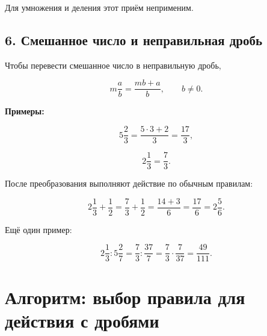 \documentclass[a4paper,12pt]{article}
\begin{document}
Для умножения и деления этот приём неприменим.

\subsection*{6. Смешанное число и неправильная дробь}

Чтобы перевести смешанное число в неправильную дробь,

\[
m\frac{a}{b}
=
\frac{mb+a}{b},
\qquad
b\ne0.
\]

\textbf{Примеры:}

\[
5\frac23
=
\frac{5\cdot3+2}{3}
=
\frac{17}{3},
\]

\[
2\frac13
=
\frac73.
\]

После преобразования выполняют действие
по обычным правилам:

\[
2\frac13+\frac12
=
\frac73+\frac12
=
\frac{14+3}{6}
=
\frac{17}{6}
=
2\frac56.
\]

Ещё один пример:

\[
2\frac13:5\frac27
=
\frac73:\frac{37}{7}
=
\frac73\cdot\frac7{37}
=
\frac{49}{111}.
\]

\clearpage
\thispagestyle{empty}

\section*{Алгоритм: выбор правила для действия с дробями}

\vspace{0.6cm}
\end{document}

